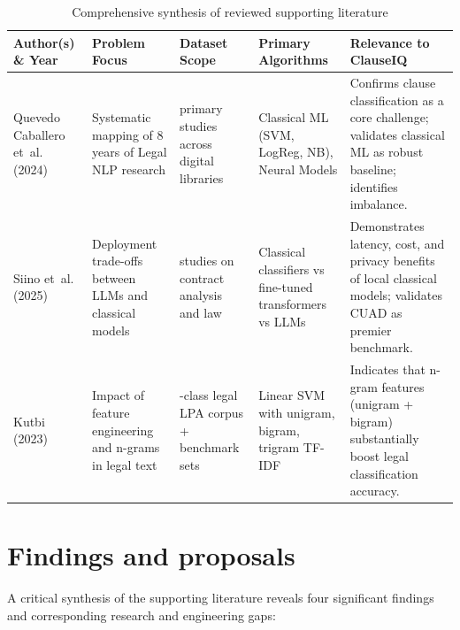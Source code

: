 \begin{table}[htbp]
\centering
\small
\setlength{\tabcolsep}{4pt}
\begin{tabular}{>{\raggedright\arraybackslash}p{2.4cm} >{\raggedright\arraybackslash}p{2.8cm} >{\raggedright\arraybackslash}p{2.0cm} >{\raggedright\arraybackslash}p{2.8cm} >{\raggedright\arraybackslash}p{3.8cm}}
\toprule
\textbf{Author(s) \& Year} & \textbf{Problem Focus} & \textbf{Dataset Scope} & \textbf{Primary Algorithms} & \textbf{Relevance to ClauseIQ} \\
\midrule
Quevedo Caballero et~al. (2024)~\cite{quevedo2024legal} & Systematic mapping of 8 years of Legal NLP research & 179 primary studies across digital libraries & Classical ML (SVM, LogReg, NB), Neural Models & Confirms clause classification as a core challenge; validates classical ML as robust baseline; identifies imbalance. \\
\addlinespace
Siino et~al. (2025)~\cite{siino2025exploring} & Deployment trade-offs between LLMs and classical models & 61 studies on contract analysis and law & Classical classifiers vs fine-tuned transformers vs LLMs & Demonstrates latency, cost, and privacy benefits of local classical models; validates CUAD as premier benchmark. \\
\addlinespace
Kutbi (2023)~\cite{kutbi2023named} & Impact of feature engineering and n-grams in legal text & 20-class legal LPA corpus + benchmark sets & Linear SVM with unigram, bigram, trigram TF-IDF & Indicates that n-gram features (unigram + bigram) substantially boost legal classification accuracy. \\
\bottomrule
\end{tabular}
\caption{Comprehensive synthesis of reviewed supporting literature}\label{tab:literature_summary}
\end{table}

\section{Findings and proposals}
\label{sec:findings_proposals}

A critical synthesis of the supporting literature reveals four significant findings and corresponding research and engineering gaps:

